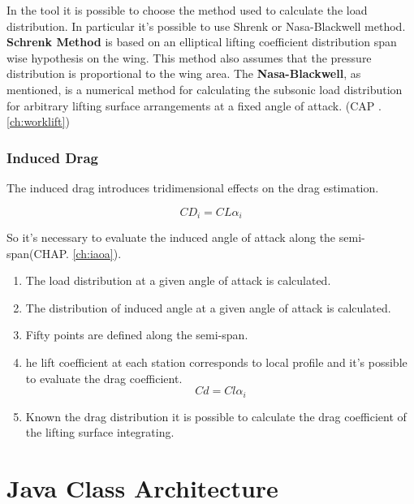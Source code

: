 	In the tool it is possible to choose the method used to calculate the load distribution. In particular it's possible to use Shrenk or Nasa-Blackwell method.\\
{\bfseries Schrenk Method} is based on an elliptical lifting coefficient distribution span wise hypothesis on the wing. This method also assumes that the pressure distribution is proportional to the wing area. 
	The {\bfseries Nasa-Blackwell}, as mentioned, is a numerical method for calculating the subsonic load distribution for arbitrary lifting surface arrangements at a fixed angle of attack. (CAP . \ref{ch:worklift})


\subsubsection{Induced Drag}

The induced drag introduces tridimensional effects on the drag estimation.

\begin{equation}
CD_i = CL \alpha_i
\end{equation}

So it's necessary to evaluate the induced angle of attack along the semi-span(CHAP. \ref{ch:iaoa}).
	
\begin{enumerate}
	\item The load distribution at a given angle of attack is calculated.
	\item The distribution of induced angle at a given angle of attack is calculated.
	\item Fifty points are defined along the semi-span.
	\item he lift coefficient at each station corresponds to local profile and it’s possible to evaluate the drag coefficient.
	\begin{equation}
	Cd =Cl \alpha_i
	\end{equation}
	\item Known the drag distribution it is possible to calculate the drag coefficient of the lifting surface integrating.
\end{enumerate}



\section{Java Class Architecture}


